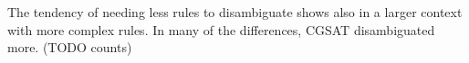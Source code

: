 \documentclass[11pt]{article}
\begin{document}
The tendency of needing less rules to disambiguate shows also in a larger context with more complex rules.
In many of the differences, CGSAT disambiguated more. (TODO counts)






\end{document}
